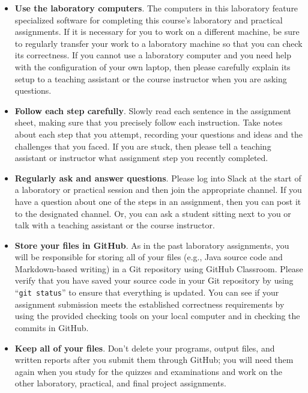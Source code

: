 \documentclass[11pt]{article}
\newcommand{\command}[1]{``\lstinline{#1}''}
\begin{document}
\begin{itemize}
  \setlength{\itemsep}{0pt}

\item {\bf Use the laboratory computers}. The computers in this laboratory
  feature specialized software for completing this course's laboratory and
  practical assignments. If it is necessary for you to work on a different
  machine, be sure to regularly transfer your work to a laboratory machine so
  that you can check its correctness. If you cannot use a laboratory computer
  and you need help with the configuration of your own laptop, then please
  carefully explain its setup to a teaching assistant or the course instructor
  when you are asking questions.

\item {\bf Follow each step carefully}. Slowly read each sentence in the
  assignment sheet, making sure that you precisely follow each instruction. Take
  notes about each step that you attempt, recording your questions and ideas and
  the challenges that you faced. If you are stuck, then please tell a teaching
  assistant or instructor what assignment step you recently completed.

\item {\bf Regularly ask and answer questions}. Please log into Slack at the
  start of a laboratory or practical session and then join the appropriate
  channel. If you have a question about one of the steps in an assignment, then
  you can post it to the designated channel. Or, you can ask a student sitting
  next to you or talk with a teaching assistant or the course instructor.

\item {\bf Store your files in GitHub}. As in the past laboratory assignments,
  you will be responsible for storing all of your files (e.g., Java source code
  and Markdown-based writing) in a Git repository using GitHub Classroom. Please
  verify that you have saved your source code in your Git repository by using
  \command{git status} to ensure that everything is updated. You can see if your
  assignment submission meets the established correctness requirements by using
  the provided checking tools on your local computer and in checking the commits
  in GitHub.

\item {\bf Keep all of your files}. Don't delete your programs, output files,
  and written reports after you submit them through GitHub; you will need them
  again when you study for the quizzes and examinations and work on the other
  laboratory, practical, and final project assignments.


\end{itemize}
\end{document}
